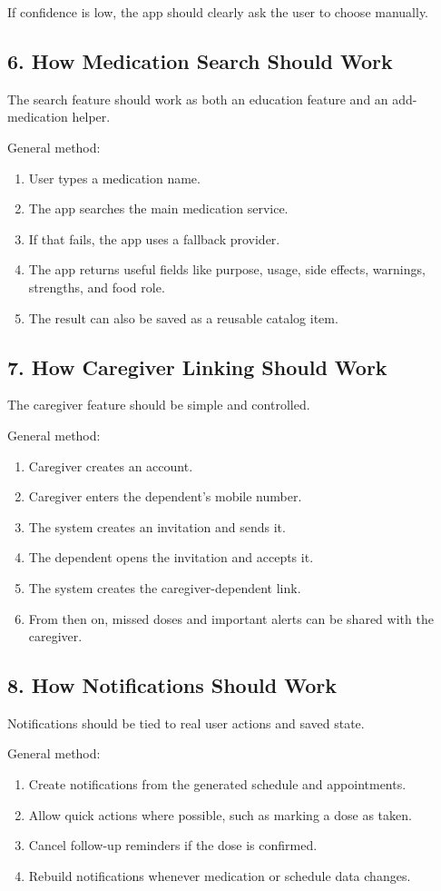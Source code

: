 \documentclass[11pt,a4paper]{article}
\begin{document}
If confidence is low, the app should clearly ask the user to choose manually.

\subsection{6. How Medication Search Should Work}
The search feature should work as both an education feature and an add-medication helper.

General method:
\begin{enumerate}
    \item User types a medication name.
    \item The app searches the main medication service.
    \item If that fails, the app uses a fallback provider.
    \item The app returns useful fields like purpose, usage, side effects, warnings, strengths, and food role.
    \item The result can also be saved as a reusable catalog item.
\end{enumerate}

\subsection{7. How Caregiver Linking Should Work}
The caregiver feature should be simple and controlled.

General method:
\begin{enumerate}
    \item Caregiver creates an account.
    \item Caregiver enters the dependent's mobile number.
    \item The system creates an invitation and sends it.
    \item The dependent opens the invitation and accepts it.
    \item The system creates the caregiver-dependent link.
    \item From then on, missed doses and important alerts can be shared with the caregiver.
\end{enumerate}

\subsection{8. How Notifications Should Work}
Notifications should be tied to real user actions and saved state.

General method:
\begin{enumerate}
    \item Create notifications from the generated schedule and appointments.
    \item Allow quick actions where possible, such as marking a dose as taken.
    \item Cancel follow-up reminders if the dose is confirmed.
    \item Rebuild notifications whenever medication or schedule data changes.
\end{enumerate}
\end{document}
